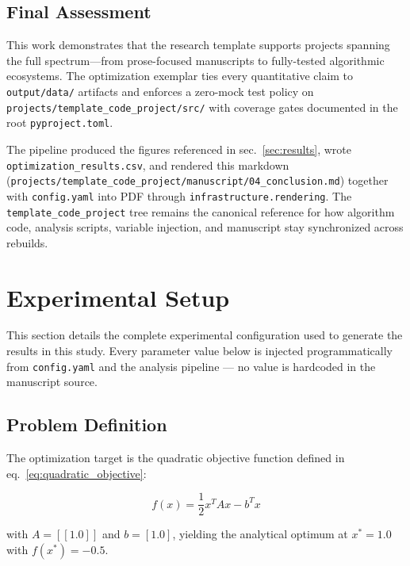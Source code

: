 \documentclass[
]{article}
\begin{document}
\subsection{Final Assessment}\label{final-assessment}

This work demonstrates that the research template supports projects
spanning the full spectrum---from prose-focused manuscripts to
fully-tested algorithmic ecosystems. The optimization exemplar ties
every quantitative claim to \texttt{output/data/} artifacts and enforces
a zero-mock test policy on
\texttt{projects/template\_code\_project/src/} with coverage gates
documented in the root \texttt{pyproject.toml}.

The pipeline produced the figures referenced in sec.~\ref{sec:results},
wrote \texttt{optimization\_results.csv}, and rendered this markdown
(\texttt{projects/template\_code\_project/manuscript/04\_conclusion.md})
together with \texttt{config.yaml} into PDF through
\texttt{infrastructure.rendering}. The \texttt{template\_code\_project}
tree remains the canonical reference for how algorithm code, analysis
scripts, variable injection, and manuscript stay synchronized across
rebuilds.

\newpage

\section{Experimental Setup}\label{sec:experimental_setup}

This section details the complete experimental configuration used to
generate the results in this study. Every parameter value below is
injected programmatically from \texttt{config.yaml} and the analysis
pipeline --- no value is hardcoded in the manuscript source.

\subsection{Problem Definition}\label{problem-definition}

The optimization target is the quadratic objective function defined in
eq.~\ref{eq:quadratic_objective}:

\begin{equation}
\label{eq:quadratic_objective}
f(x) = \frac{1}{2} x^T A x - b^T x
\end{equation}

with \(A = [[1.0]]\) and \(b = [1.0]\), yielding the analytical optimum
at \(x^* = 1.0\) with \(f(x^*) = -0.5\).
\end{document}

